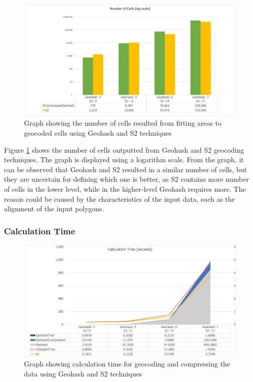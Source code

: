 \begin{figure}[htb!]
  \centering
  \includegraphics[width=\textwidth]{images/ResultsNumCells.png}
  \caption{Graph showing the number of cells resulted from fitting areas to geocoded cells using Geohash and S2 techniques}
  \label{fig:ResultsNumCells}
\end{figure}

\npara Figure \ref{fig:ResultsNumCells} shows the number of cells outputted from Geohash and S2 geocoding techniques.
The graph is displayed using a logarithm scale.
From the graph, it can be observed that Geohash and S2 resulted in a similar number of cells, but they are uncertain for defining which one is better, as S2 contains more number of cells in the lower level, while in the higher-level Geohash requires more.
The reason could be caused by the characteristics of the input data, such as the alignment of the input polygons.

\subsubsection*{Calculation Time}

\begin{figure}[htb!]
  \centering
  \includegraphics[width=\textwidth]{images/ResultsGSCalculationTime.png}
  \caption{Graph showing calculation time for geocoding and compressing the data using Geohash and S2 techniques}
  \label{fig:ResultsGSCalculationTime}
\end{figure}

